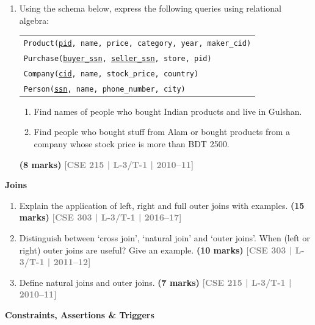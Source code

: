 \documentclass[12pt,a3paper]{article}
\newcommand{\yr}[1]{\hfill\textcolor{gray}{\small\textbf{[#1]}}}
\newcommand{\mk}[1]{\textcolor{orange!70!black}{\small\textbf{(#1 marks)}}}
\newcommand{\subtopic}[2]{%
  \vspace{10pt}
  \noindent\begin{tcolorbox}[colback=#1!8,colframe=#1,boxrule=0.6pt,arc=4pt,
    left=6pt,right=6pt,top=4pt,bottom=4pt]
    \small\bfseries\textcolor{#1}{#2}
  \end{tcolorbox}
  \vspace{2pt}
}
\begin{document}
\begin{enumerate}
\item Using the schema below, express the following queries using relational algebra:
\begin{center}
\begin{tabular}{l}
\texttt{Product(\underline{pid}, name, price, category, year, maker\_cid)}\\
\texttt{Purchase(\underline{buyer\_ssn}, \underline{seller\_ssn}, store, pid)}\\
\texttt{Company(\underline{cid}, name, stock\_price, country)}\\
\texttt{Person(\underline{ssn}, name, phone\_number, city)}
\end{tabular}
\end{center}
\begin{enumerate}
  \item Find names of people who bought Indian products and live in Gulshan.
  \item Find people who bought stuff from Alam or bought products from a company whose stock price is more than BDT 2500.
\end{enumerate}
\mk{8} \yr{CSE 215 | L-3/T-1 | 2010--11}

\end{enumerate}

\subtopic{cB}{Joins}
\label{sub:s3-joins}

\begin{enumerate}

\item Explain the application of left, right and full outer joins with examples.
\mk{15} \yr{CSE 303 | L-3/T-1 | 2016--17}

\item Distinguish between `cross join', `natural join' and `outer joins'. When (left or right) outer joins are useful? Give an example.
\mk{10} \yr{CSE 303 | L-3/T-1 | 2011--12}

\item Define natural joins and outer joins.
\mk{7} \yr{CSE 215 | L-3/T-1 | 2010--11}

\end{enumerate}

\subtopic{cB}{Constraints, Assertions \& Triggers}
\label{sub:s3-constraints}
\end{document}

